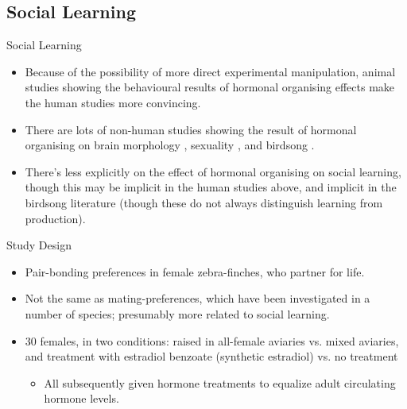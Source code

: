 \documentclass[hyperref={pdfpagelabels=false}]{beamer}
\begin{document}
\subsection{Social Learning}

\begin{frame}{Social Learning}
\begin{itemize}
	\item Because of the possibility of more direct experimental manipulation, animal studies showing the behavioural results of hormonal organising effects make the human studies more convincing.
	\item There are lots of non-human studies showing the result of hormonal organising on brain morphology \citep[e.g. in rats, going back to][]{gorski1978}, sexuality \citep[many references in][Chapts. 3-4]{balthazart2011}, and birdsong \citep[see][for an overview]{balthazartetal2009}.
	\item There's less explicitly on the effect of hormonal organising on social learning, though this may be implicit in the human studies above, and implicit in the birdsong literature (though these do not always distinguish learning from production).
\end{itemize}

\end{frame}

\begin{frame}{\citet{mansukhanietal1996}}
\begin{block}{Study Design}
\begin{itemize}
	\item Pair-bonding preferences in female zebra-finches, who partner for life.
	\item Not the same as mating-preferences, which have been investigated in a number of species; presumably more related to social learning.
	\item 30 females, in two conditions: raised in all-female aviaries vs. mixed aviaries, and treatment with estradiol benzoate (synthetic estradiol) vs. no treatment
		\begin{itemize}
		\item All subsequently given hormone treatments to equalize adult circulating hormone levels.
		\end{itemize}
\end{itemize}
\end{block}
\end{frame}
\end{document}
